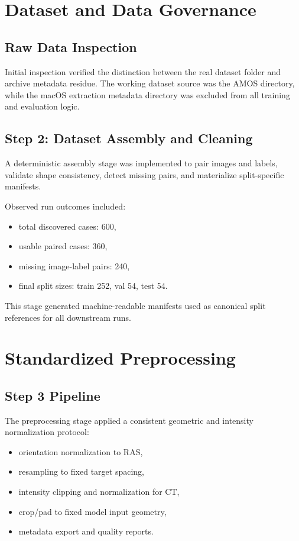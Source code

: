 \documentclass[11pt,a4paper]{article}
\begin{document}
\section{Dataset and Data Governance}
\subsection{Raw Data Inspection}
Initial inspection verified the distinction between the real dataset folder and archive metadata residue. The working dataset source was the AMOS directory, while the macOS extraction metadata directory was excluded from all training and evaluation logic.

\subsection{Step 2: Dataset Assembly and Cleaning}
A deterministic assembly stage was implemented to pair images and labels, validate shape consistency, detect missing pairs, and materialize split-specific manifests.

Observed run outcomes included:
\begin{itemize}
\item total discovered cases: 600,
\item usable paired cases: 360,
\item missing image-label pairs: 240,
\item final split sizes: train 252, val 54, test 54.
\end{itemize}

This stage generated machine-readable manifests used as canonical split references for all downstream runs.

\section{Standardized Preprocessing}
\subsection{Step 3 Pipeline}
The preprocessing stage applied a consistent geometric and intensity normalization protocol:
\begin{itemize}
\item orientation normalization to RAS,
\item resampling to fixed target spacing,
\item intensity clipping and normalization for CT,
\item crop/pad to fixed model input geometry,
\item metadata export and quality reports.
\end{itemize}
\end{document}
